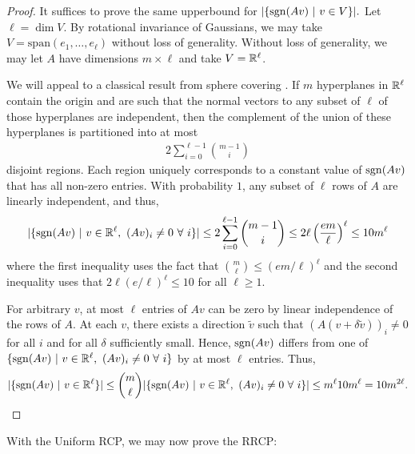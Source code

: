 \documentclass{article}
\begin{document}
\begin{proof}
It suffices to prove the same upperbound for $|\{\operatorname{sgn}(Av)\ |\ v \in V\}|.$ Let $\ell = \dim V$. By rotational invariance of Gaussians, we may take $V = \text{span}(e_1,\dots,e_{\ell})$ without loss of generality. Without loss of generality, we may let $A$ have dimensions $m \times 
\ell$ and take $V = \mathbb{R}^{\ell}$.

We will appeal to a classical result from sphere covering \cite{sphere_covering}. If $m$ hyperplanes in $\mathbb{R}^{\ell}$ contain the origin and are such that the normal vectors to any subset of $\ell$ of those hyperplanes are independent, then the complement of the union of these hyperplanes is partitioned into at most \begin{align*}
2 \sum_{i = 0}^{\ell - 1} \binom{m-1}{i}
\end{align*} disjoint regions. Each region uniquely corresponds to a constant value of $\operatorname{sgn}(Av)$ that has all non-zero entries. With probability $1$, any subset of $\ell$ rows of $A$ are linearly independent, and thus, \begin{align*}
|\{\operatorname{sgn}(Av)\ |\ v \in \mathbb{R}^{\ell},\ (Av)_i \neq 0\ \forall\ i\}| \leq 2 \sum_{i=0}^{\ell - 1} \binom{m-1}{i} \leq 2\ell \left(\frac{e m}{\ell}\right)^{\ell} \leq 10m^{\ell}
\end{align*} where the first inequality uses the fact that $\binom{m}{\ell} \leq (em/\ell)^{\ell}$ and the second inequality uses that $2\ell (e/\ell)^{\ell} \leq 10$ for all $\ell \geq 1$.

For arbitrary $v$, at most $\ell$ entries of $Av$ can be zero by linear independence of the rows of $A$. At each $v$, there exists a direction $\tilde{v}$ such that $(A(v + \delta \tilde{v}))_{i} \neq 0$ for all $i$ and for all $\delta$ sufficiently small. Hence, $\operatorname{sgn}(Av)$ differs from one of $\{\operatorname{sgn}(Av)\ |\ v \in \mathbb{R}^{\ell},\ (Av)_{i} \neq 0\ \forall\ i\}$ by at most $\ell$ entries. Thus, \begin{align*}
|\{\sgn(Av)\ |\ v \in \R^{\ell}\}| \leq \binom{m}{\ell} |\{\sgn(Av)\ |\ v \in \R^{\ell},\ (Av)_i \neq 0\ \forall\ i\}| \leq m^{\ell} 10 m^{\ell} = 10m^{2\ell}.
\end{align*}
\end{proof}

With the Uniform RCP, we may now prove the RRCP:
\end{document}
